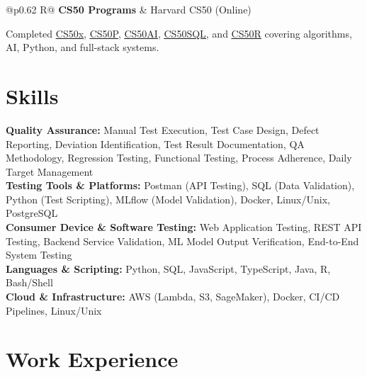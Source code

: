 \documentclass[a4paper,10pt]{article}
\newcommand{\ulink}[2]{\href{#1}{\uline{#2}}}
\newcommand{\subheading}[1]{{\color[HTML]{0A0A0A}\fontsize{12}{14}\selectfont\bfseries #1}}
\newcommand{\meta}[1]{{\color[HTML]{5C5C5C}\fontsize{10.5}{12.5}\selectfont #1}}
\begin{document}
\begin{tabularx}{\linewidth}{@{}p{0.62\linewidth} R@{}}
\subheading{CS50 Programs} & \meta{Harvard CS50 (Online)}
\end{tabularx}
\vspace{1pt}
{\color[HTML]{3A3A3A}\fontsize{11}{14}\selectfont Completed \ulink{https://cs50.harvard.edu/certificates/b14b78df-e05c-413e-a607-1dd27303053a}{CS50x}, \ulink{https://cs50.harvard.edu/certificates/32477052-9db4-49c4-a5a4-d7e58429ca2c}{CS50P}, \ulink{https://cs50.harvard.edu/certificates/9cdb4d4a-1250-4f8e-9fd7-191864e0f919}{CS50AI}, \ulink{https://cs50.harvard.edu/certificates/bc486f24-f085-4e61-8536-80940b97a1b9}{CS50SQL}, and \ulink{https://cs50.harvard.edu/certificates/666838e6-a053-4d82-b179-a60fe745fd84}{CS50R} covering algorithms, AI, Python, and full-stack systems.}

\vspace{2pt}

\section{Skills}
\vspace{5pt}
{\color[HTML]{0A0A0A}\fontsize{11}{14}\selectfont
\textbf{Quality Assurance:} Manual Test Execution, Test Case Design, Defect Reporting, Deviation Identification, Test Result Documentation, QA Methodology, Regression Testing, Functional Testing, Process Adherence, Daily Target Management \\[2pt]
\textbf{Testing Tools \& Platforms:} Postman (API Testing), SQL (Data Validation), Python (Test Scripting), MLflow (Model Validation), Docker, Linux/Unix, PostgreSQL \\[2pt]
\textbf{Consumer Device \& Software Testing:} Web Application Testing, REST API Testing, Backend Service Validation, ML Model Output Verification, End-to-End System Testing \\[2pt]
\textbf{Languages \& Scripting:} Python, SQL, JavaScript, TypeScript, Java, R, Bash/Shell \\[2pt]
\textbf{Cloud \& Infrastructure:} AWS (Lambda, S3, SageMaker), Docker, CI/CD Pipelines, Linux/Unix}

\vspace{2pt}

\section{Work Experience}
\vspace{2pt}
\end{document}

